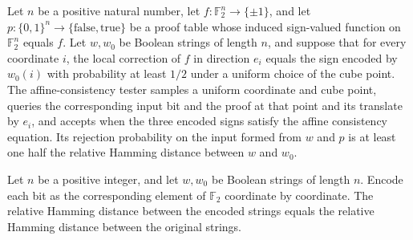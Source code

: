 \begin{theorem}
\label{FABL.half_relativeHammingDist_le_affineConsistency_rejection}
\leanok
{}
Let $n$ be a positive natural number, let $f:\mathbb F_2^n\to\{\pm1\}$, and let
$p:\{0,1\}^n\to\{\mathrm{false},\mathrm{true}\}$ be a proof table whose induced
sign-valued function on $\mathbb F_2^n$ equals $f$. Let $w,w_0$ be Boolean strings of
length $n$, and suppose that for every coordinate $i$, the local correction of $f$ in
direction $e_i$ equals the sign encoded by $w_0(i)$ with probability at least $1/2$
under a uniform choice of the cube point. The affine-consistency tester samples a
uniform coordinate and cube point, queries the corresponding input bit and the proof at
that point and its translate by $e_i$, and accepts when the three encoded signs satisfy
the affine consistency equation. Its rejection probability on the input formed from $w$
and $p$ is at least one half the relative Hamming distance between $w$ and $w_0$.
\end{theorem}

\begin{theorem}
\label{FABL.relativeHammingDist_pcppBoolCubeEquiv}
\leanok
{}
Let $n$ be a positive integer, and let $w,w_0$ be Boolean strings of length $n$. Encode
each bit as the corresponding element of $\mathbb F_2$ coordinate by coordinate. The
relative Hamming distance between the encoded strings equals the relative Hamming
distance between the original strings.
\end{theorem}

